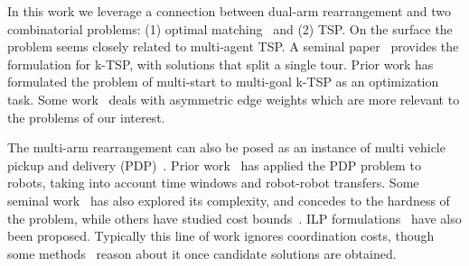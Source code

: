 
In this work we leverage a connection between dual-arm rearrangement and two combinatorial problems: (1) optimal matching~\cite{edmonds1965maximum} and (2) TSP. On the surface the problem seems closely related to multi-agent TSP.
A seminal paper~\cite{frederickson1976approximation} provides the formulation for k-TSP, with solutions that split a single tour.
Prior work \cite{rathinam2006matroid} has formulated the problem of multi-start to multi-goal k-TSP as an optimization task. Some work~\cite{friggstad2013multiple} deals with asymmetric edge weights which are more relevant to the problems of our interest.
 

The multi-arm rearrangement can also be posed as an instance of multi vehicle pickup and delivery (PDP)~\cite{parragh2008survey}. 
Prior work~\cite{coltin2014multi} has applied the PDP problem to robots, taking into account time windows and robot-robot transfers.
Some seminal work~\cite{lenstra1981complexity,savelsbergh1995general} has also explored its complexity, and concedes to the hardness of the problem, while others have studied cost bounds~\cite{TrePavFra13}. ILP formulations~\cite{savelsbergh1995general} have also been proposed. 
Typically this line of work ignores coordination costs, though some methods~\cite{caricato2003parallel} reason about it once candidate solutions are obtained.

